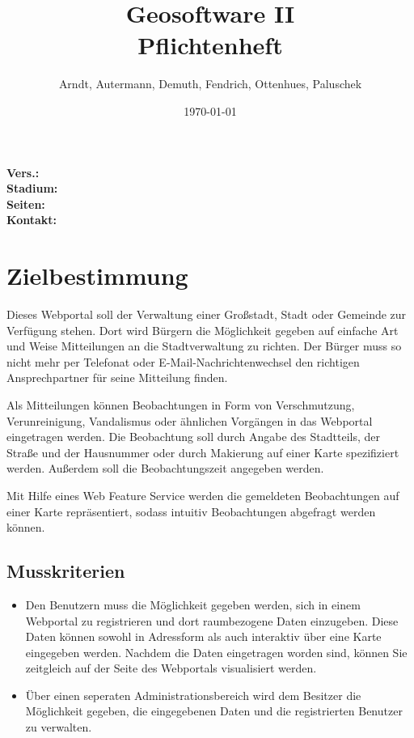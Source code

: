 \documentclass[a4paper,11pt]{scrartcl}
\begin{document}
\title{Geosoftware II \\ \small Pflichtenheft}
\author{Arndt, Autermann, Demuth, Fendrich, Ottenhues, Paluschek}
\date{\today}
\maketitle
\thispagestyle{empty}

\begin{center}
\bf Vers.: \MyVersion \\
\bf Stadium: \MyStatus\\
\bf Seiten: \thelastpage \\
\bf Kontakt: \email \\
\end{center}
\newpage

\tableofcontents

\newpage

\section{Zielbestimmung}
	Dieses Webportal soll der Verwaltung einer Großstadt, Stadt oder Gemeinde zur Verfügung stehen. Dort wird Bürgern die Möglichkeit gegeben auf einfache Art und Weise Mitteilungen an die Stadtverwaltung zu richten. Der Bürger muss so nicht mehr per Telefonat oder E-Mail-Nachrichtenwechsel den richtigen Ansprechpartner für seine Mitteilung  finden. 

	Als Mitteilungen können Beobachtungen in Form von Verschmutzung, Verunreinigung, Vandalismus oder ähnlichen Vorgängen in das Webportal eingetragen werden. Die Beobachtung soll durch Angabe des Stadtteils, der Straße und der Hausnummer oder durch Makierung auf einer Karte spezifiziert werden. Außerdem soll die Beobachtungszeit angegeben werden.

	Mit Hilfe eines Web Feature Service werden die gemeldeten Beobachtungen auf einer Karte repräsentiert, sodass intuitiv Beobachtungen abgefragt werden können.
	\subsection{Musskriterien}
		\begin{itemize}
			\item Den Benutzern muss die Möglichkeit gegeben werden, sich in einem Webportal zu registrieren und dort raumbezogene Daten einzugeben. Diese Daten können sowohl in Adressform als auch interaktiv über eine Karte eingegeben werden. Nachdem die Daten eingetragen worden sind, können Sie zeitgleich auf der Seite des Webportals visualisiert werden.
	            \item Über einen seperaten Administrationsbereich wird dem Besitzer die Möglichkeit gegeben, die eingegebenen Daten und die registrierten Benutzer zu verwalten. 
		\end{itemize}
\end{document}
